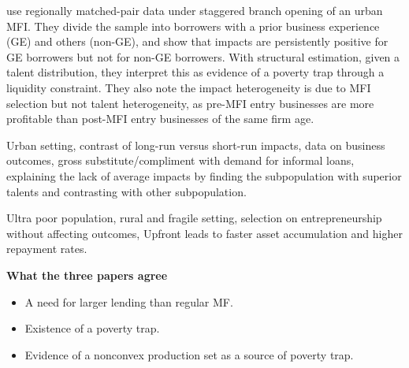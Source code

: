 	\citet{Banerjee2019MFPovertyTrap} use regionally matched-pair data under staggered branch opening of an urban MFI. They divide the sample into borrowers with a prior business experience (GE) and others (non-GE), and show that impacts are persistently positive for GE borrowers but not for non-GE borrowers. With structural estimation, given a talent distribution, they interpret this as evidence of a poverty trap through a liquidity constraint. They also note the impact heterogeneity is due to MFI selection but not talent heterogeneity, as pre-MFI entry businesses are more profitable than post-MFI entry businesses of the same firm age. 

\begin{description}
\vspace{1.0ex}\setlength{\itemsep}{1.0ex}\setlength{\baselineskip}{12pt}
\item[their strength]	Urban setting, contrast of long-run versus short-run impacts, data on business outcomes, gross substitute/compliment with demand for informal loans, explaining the lack of average impacts by finding the subpopulation with superior talents and contrasting with other subpopulation.
\item[our strength]	Ultra poor population, rural and fragile setting, selection on entrepreneurship without affecting outcomes, \textsf{Upfront} leads to faster asset accumulation and higher repayment rates.
\end{description}

\noindent
\textbf{What the three papers agree}

\begin{itemize}
\vspace{1.0ex}\setlength{\itemsep}{1.0ex}\setlength{\baselineskip}{12pt}
\item	A need for larger lending than regular MF.
\item	Existence of a poverty trap.
\item	Evidence of a nonconvex production set as a source of poverty trap.
\end{itemize}

\newpage
\setcounter{tocdepth}{3}
\tableofcontents
\newpage

\setlength{\parindent}{1em}
\vspace{2ex}









\renewcommand{\thefootnote}{*\arabic{footnote}}
\setcounter{footnote}{0}


